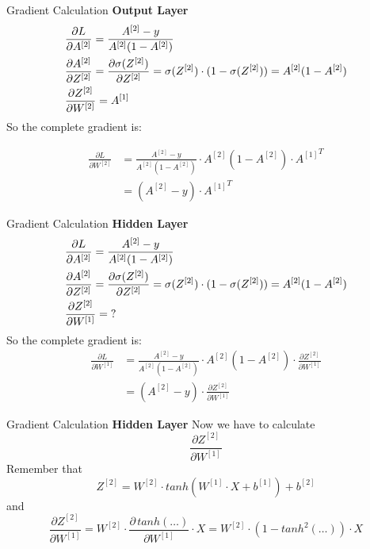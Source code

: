 \documentclass[11pt]{beamer}
\begin{document}
\begin{frame}{Gradient Calculation}
\textbf{Output Layer}
\begin{align*}
& \frac{\partial L}{\partial A^{[2]}} = \frac{A^{[2]} - y}{A^{[2]}(1 - A^{[2]})} \notag\\
& \frac{\partial A^{[2]}}{\partial Z^{[2]}} = \frac{\partial \sigma(Z^{[2]})}{\partial Z^{[2]}} = \sigma(Z^{[2]}) \cdot (1 - \sigma(Z^{[2]})) 
= A^{[2]} (1 - A^{[2]}) \\
& \frac{\partial Z^{[2]}}{\partial W^{[2]}} = A^{[1]} 
\end{align*}
So the complete gradient is:

\begin{tcolorbox}
\begin{align*}
\frac{\partial L}{\partial W^{[2]}} &=  
\frac{A^{[2]} - y}{A^{[2]}(1 - A^{[2]})} \cdot 
A^{[2]} (1 - A^{[2]}) \cdot {A^{[1]}}^T \\
&= (A^{[2]} - y) \cdot {A^{[1]}}^T
\end{align*}
\end{tcolorbox}

\end{frame}
\begin{frame}{Gradient Calculation}
\textbf{Hidden Layer}
\begin{align*}
& \frac{\partial L}{\partial A^{[2]}} = \frac{A^{[2]} - y}{A^{[2]}(1 - A^{[2]})} \notag\\
& \frac{\partial A^{[2]}}{\partial Z^{[2]}} = \frac{\partial \sigma(Z^{[2]})}{\partial Z^{[2]}} = \sigma(Z^{[2]}) \cdot (1 - \sigma(Z^{[2]})) 
= A^{[2]} (1 - A^{[2]}) \\
& \frac{\partial Z^{[2]}}{\partial W^{[1]}} = \mathbf{?} 
\end{align*}
So the complete gradient is:
\begin{align*}
\frac{\partial L}{\partial W^{[1]}} &=  
\frac{A^{[2]} - y}{A^{[2]}(1 - A^{[2]})} \cdot 
A^{[2]} (1 - A^{[2]}) \cdot \frac{\partial Z^{[2]}}{\partial W^{[1]}} \\
&= (A^{[2]} - y) \cdot \frac{\partial Z^{[2]}}{\partial W^{[1]}}
\end{align*}
\end{frame}
\begin{frame}{Gradient Calculation}
\textbf{Hidden Layer}
Now we have to calculate
$$\frac{\partial Z^{[2]}}{\partial W^{[1]}}$$
Remember that
$$Z^{[2]} = W^{[2]} \cdot tanh\left( W^{[1]} \cdot X + b^{[1]} \right) + b^{[2]}$$
and
$$\frac{\partial Z^{[2]}}{\partial W^{[1]}} = W^{[2]} \cdot \frac{\partial \, tanh(\dots)}{\partial W^{[1]}} \cdot X = W^{[2]} \cdot \left( 1 - tanh^2(\dots) \right) \cdot X$$
\end{frame}
\end{document}
